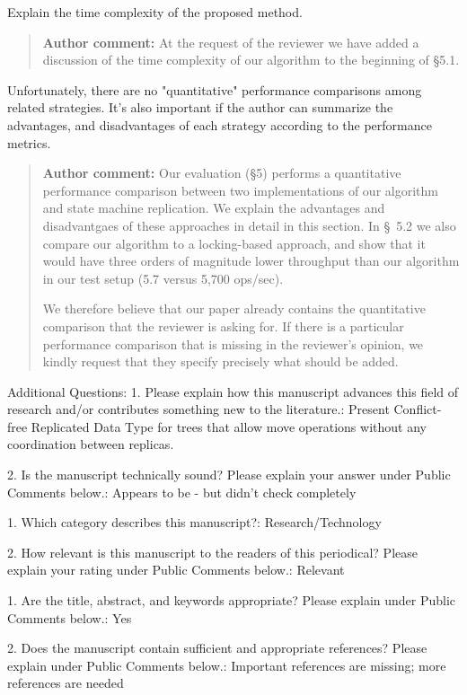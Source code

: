 \documentclass[10pt]{article}
\newcommand{\authorcomment}[1]{\begin{quote}\textbf{Author comment:} #1\end{quote}}
\begin{document}
\begin{spverbatim}
Explain the time complexity of the proposed method.
\end{spverbatim}
\authorcomment{At the request of the reviewer we have added a discussion of the time complexity of our algorithm to the beginning of {\S}5.1.}
\begin{spverbatim}
Unfortunately, there are no "quantitative" performance comparisons among related strategies. It’s also important if the author can summarize the advantages, and disadvantages of each strategy according to the performance metrics.
\end{spverbatim}
\authorcomment{Our evaluation ({\S}5) performs a quantitative performance comparison between two implementations of our algorithm and state machine replication.
We explain the advantages and disadvantgaes of these approaches in detail in this section.
In \S~5.2 we also compare our algorithm to a locking-based approach, and show that it would have three orders of magnitude lower throughput than our algorithm in our test setup (5.7 versus 5,700 ops/sec).

We therefore believe that our paper already contains the quantitative comparison that the reviewer is asking for.
If there is a particular performance comparison that is missing in the reviewer's opinion, we kindly request that they specify precisely what should be added.}
\begin{spverbatim}

Additional Questions:
1.  Please explain how this manuscript advances this field of research and/or contributes something new to the literature.: Present Conflict-free Replicated Data Type for trees that allow move operations without any coordination between replicas.

2. Is the manuscript technically sound? Please explain your answer under Public Comments below.: Appears to be - but didn't check completely

1. Which category describes this manuscript?: Research/Technology

2. How relevant is this manuscript to the readers of this periodical? Please explain your rating under Public Comments below.: Relevant

1. Are the title, abstract, and keywords appropriate? Please explain under Public Comments below.: Yes

2. Does the manuscript contain sufficient and appropriate references? Please explain under Public Comments below.: Important references are missing; more references are needed
\end{spverbatim}
\end{document}
